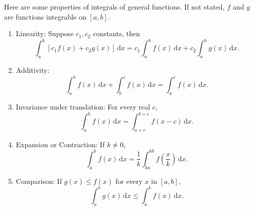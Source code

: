 \documentclass[a4paper]{ctexart}
\begin{document}
	\begin{mythm}
		Here are some properties of integrals of general functions. If not stated, $f$ and $g$ are functions integrable on $[a,b]$.
		\begin{enumerate}
			\item Linearity: Suppose $c_1,c_2$ constants, then
			\[
			\int_a^b \left[ c_1 f(x) + c_2 g(x) \right] \, \mathrm{d}x
			= c_1 \int_a^b f(x) \, \mathrm{d}x
			+ c_2 \int_a^b g(x) \, \mathrm{d}x.
			\]
			\item Additivity:
			\[
			\int_a^b f(x) \, \mathrm{d}x
			+ \int_b^c f(x) \, \mathrm{d}x
			= \int_a^c f(x) \, \mathrm{d}x.
			\]
			\item Invariance under translation: For every real $c$,
			\[
			\int_a^b f(x) \, \mathrm{d}x
			= \int_{a+c}^{b+c} f(x - c) \, \mathrm{d}x.
			\]
			\item Expansion or Contraction: If $k\neq 0$,
			\[
			\int_a^b f(x) \, \mathrm{d}x
			= \frac{1}{k} \int_{ka}^{kb} f\!\left( \frac{x}{k} \right) \, \mathrm{d}x.
			\]
			\item Comparison: If $g(x)\le f(x)$ for every $x$ in $[a,b]$,
			\[
			\int_a^b g(x) \, \mathrm{d}x
			\le \int_a^b f(x) \, \mathrm{d}x.
			\]
		\end{enumerate}
	\end{mythm}
\end{document}

